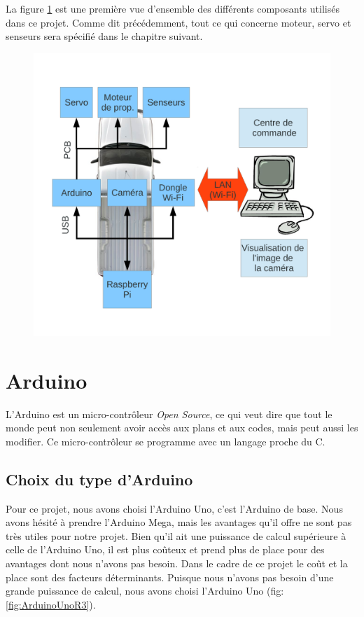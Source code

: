 \documentclass[a4paper,11pt]{report}
\begin{document}
{La figure
\ref{SchemaProjet} est une première vue d'ensemble des différents composants
utilisés dans ce projet. Comme dit précédemment, tout ce qui concerne moteur,
servo et senseurs sera spécifié dans le chapitre suivant. 

\begin{figure}[h]
\includegraphics[width = 1.0\textwidth]{SchemaPres.pdf}
\caption[Schéma du hardware]{\label{SchemaProjet}}
\end{figure}

\section{Arduino}
L'Arduino \label{Arduino} \cite{Arduino} est un micro-contrôleur \textit{Open Source}, ce qui veut dire que tout le monde peut non seulement avoir accès aux plans et aux codes, mais peut aussi les modifier.\cite{openSource} Ce micro-contrôleur se programme avec un langage proche du C. 


\subsection{Choix du type d'Arduino}
Pour ce projet, nous avons choisi l'Arduino Uno, c'est l'Arduino de base.  Nous avons hésité à prendre l'Arduino Mega, mais les avantages qu'il offre ne sont pas très utiles pour notre projet. Bien qu'il ait une puissance de calcul supérieure à celle de l'Arduino Uno, il est plus coûteux et prend plus de place pour des avantages dont nous n'avons pas besoin. Dans le cadre de ce projet le coût et la place sont des facteurs déterminants.  Puisque nous n'avons pas besoin d'une grande puissance de calcul, nous avons choisi l'Arduino Uno (fig: \ref{fig:ArduinoUnoR3}).\\

}
\end{document}
